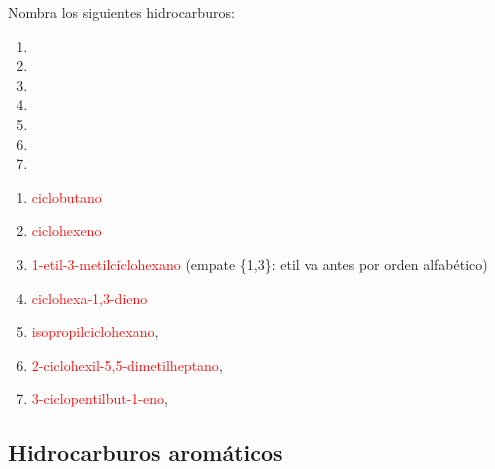 \begin{exercise}
    Nombra los siguientes hidrocarburos:
    \begin{enumerate}[label=\alph*)]
        \item {}
        \item {}
        \item {}
        \item {}
        \item {}
        \item {}
        \item {}
    \end{enumerate}
    \begin{solu}
        \begin{enumerate}[label=\alph*)]
            \item \textcolor{red}{ciclobutano}
            \item \textcolor{red}{ciclohexeno}
            \item \textcolor{red}{1-etil-3-metilciclohexano} (empate \{1,3\}: etil va antes por orden alfabético)
            \item \textcolor{red}{ciclohexa-1,3-dieno}
            \item \textcolor{red}{isopropilciclohexano}, 
            \item \textcolor{red}{2-ciclohexil-5,5-dimetilheptano}, 
            \item \textcolor{red}{3-ciclopentilbut-1-eno}, 
        \end{enumerate}
    \end{solu}
\end{exercise}

\subsection*{Hidrocarburos aromáticos}

